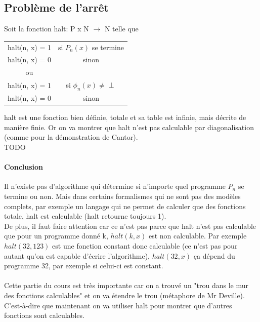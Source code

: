 \documentclass[11pt,a4paper]{article}
\begin{document}
\subsection{Problème de l'arrêt}
\label{sub:probl_me_de_l_arr_t}

Soit la fonction halt: P x N $\rightarrow$ N telle que \\
\begin{tabular}{cc}
  halt(n, x) = 1 & si $P_n(x)$ se termine \\
  halt(n, x) = 0 & sinon \\
  ou &\\
  halt(n, x) = 1 & si $\phi_n(x)\neq \perp$ \\
  halt(n, x) = 0 & sinon \\
\end{tabular}

halt est une fonction bien définie, totale et sa table est infinie, mais décrite 
de manière finie. Or on va montrer que halt n'est pas calculable par 
diagonalisation (comme pour la démonstration de Cantor).\\

TODO \\

\paragraph{Conclusion} Il n'existe pas d'algorithme qui détermine si n'importe 
quel programme $P_n$ se termine ou non. Mais dans certains formalismes qui ne 
sont pas des modèles complets, par exemple un langage qui ne permet de calculer 
que des fonctions totale, halt est calculable (halt retourne toujours 1). \\
De plus, il faut faire attention car ce n'est pas parce que halt n'est pas 
calculable que pour un programme donné k, $halt(k,x)$ est non calculable. Par 
exemple $halt(32,123)$ est une fonction constant donc calculable (ce n'est pas 
pour autant qu'on est capable d'écrire l'algorithme), $halt(32,x)$ ça dépend du 
programme 32, par exemple si celui-ci est constant.

\paragraph{} Cette partie du cours est très importante car on a trouvé un 
"trou dans le mur des fonctions calculables" et on va étendre le trou (métaphore
de Mr Deville). C'est-à-dire que maintenant on va utiliser halt pour montrer 
que d'autres fonctions sont calculables.
\end{document}
